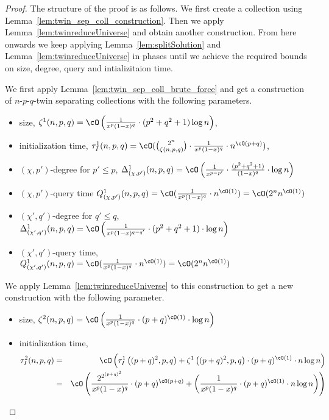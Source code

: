 \begin{proof}
The structure of the proof is as follows. We first create a collection using Lemma~\ref{lem:twin_sep_coll_construction}. 
Then we apply Lemma~\ref{lem:twinreduceUniverse} and obtain another construction. From here onwards we keep applying Lemma~\ref{lem:splitSolution} and Lemma~\ref{lem:twinreduceUniverse} in phases until we achieve the 
required bounds on size, degree, query and intializitaion time. 

We first apply Lemma~\ref{lem:twin_sep_coll_brute_force} and get a construction of $n$-$p$-$q$-twin separating collections with the following parameters.
\begin{itemize}\setlength\itemsep{-.7mm}
\item size, $\zeta^1(n,p,q) =\cO \left(\frac{1}{x^{p}(1-x)^q} \cdot (p^2+q^2+1)\log n \right)$, 
\item initialization time, $\tau_I^1(n,p,q) = \cO({2^n \choose \zeta(n,p,q)} \cdot \frac{1}{x^p(1-x)^q} \cdot n^{\cO(p+q)})$,
\item $(\chi,p')$-degree for $p'\leq p$, $\Delta^1_{(\chi,p')}(n,p,q) = \cO\left(\frac{1}{x^{p-p'}}\cdot\frac{(p^2+q^2+1)}{(1-x)^q} \cdot \log n\right)$
\item $(\chi,p')$-query time ${Q^1_{(\chi,p')}}(n,p,q) = \cO(\frac{1}{x^{p}(1-x)^q} \cdot n^{\cO(1)})=\cO(2^n n^{\cO(1)})$
\item $(\chi',q')$-degree for $q'\leq q$, $\Delta^1_{(\chi',q')}(n,p,q)=\cO\left(\frac{1}{x^{p}(1-x)^{q-q'}}\cdot(p^2+q^2+1) \cdot \log n\right)$
\item $(\chi',q')$-query time, ${Q^1_{(\chi',q')}}(n,p,q)=\cO(\frac{1}{x^{p}(1-x)^q} \cdot n^{\cO(1)})=\cO(2^n n^{\cO(1)})$
\end{itemize}
We apply Lemma~\ref{lem:twinreduceUniverse} to this construction to get a new construction with the following parameter.
\begin{itemize} \item size, $\zeta^2(n,p,q)=\cO\left(\frac{1}{x^{p}(1-x)^q} \cdot  (p+q)^{\cO(1)} \cdot \log n\right)$ 
\item initialization time, 
\begin{eqnarray*}
\tau_I^2(n,p,q) &=& \cO\left(\tau_I^1\left((p+q)^2,p,q\right) + \zeta^1\left((p+q)^2,p,q\right) \cdot (p+q)^{\cO(1)} \cdot n \log n\right)\\
&=& \cO\left(
\frac{2^{2^{(p+q)^2}}}{x^p(1-x)^q} \cdot (p+q)^{\cO(p+q)} + \left(\frac{1}{x^{p}(1-x)^q} \cdot (p+q)^{\cO(1)} \cdot n \log n \right)\right)\\

\end{eqnarray*}
\end{itemize}
\end{proof}
